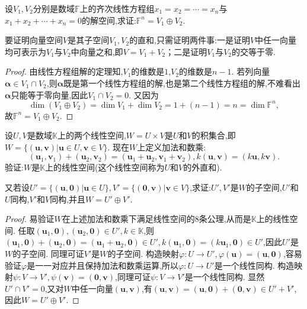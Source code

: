 \documentclass[../../main.tex]{subfiles}
\begin{document}
\begin{example}
设\(V_1,V_2\)分别是数域\(\mathbb{F}\)上的齐次线性方程组\(x_1 = x_2=\cdots = x_n\)与\(x_1 + x_2+\cdots + x_n = 0\)的解空间,求证:\(\mathbb{F}^n = V_1\oplus V_2\).
\end{example}
\begin{note}
要证明向量空间\(V\)是其子空间\(V_1,V_2\)的直和,只需证明两件事:一是证明\(V\)中任一向量均可表示为\(V_1\)与\(V_2\)中向量之和,即\(V = V_1 + V_2\)；二是证明\(V_1\)与\(V_2\)的交等于零.
\end{note}
\begin{proof}
由线性方程组解的定理知,\(V_1\)的维数是\(1\),\(V_2\)的维数是\(n - 1\). 若列向量\(\boldsymbol{\alpha}\in V_1\cap V_2\),则\(\boldsymbol{\alpha}\)既是第一个线性方程组的解,也是第二个线性方程组的解,不难看出\(\boldsymbol{\alpha}\)只能等于零向量,因此\(V_1\cap V_2 = 0\). 又因为
\[
\dim(V_1\oplus V_2)=\dim V_1+\dim V_2=1+(n - 1)=n=\dim\mathbb{F}^n,
\]
故\(\mathbb{F}^n = V_1\oplus V_2\).
\end{proof}

\begin{example}
设\(U,V\)是数域\(\mathbb{K}\)上的两个线性空间,\(W = U\times V\)是\(U\)和\(V\)的积集合,即\(W=\{(\boldsymbol{u},\boldsymbol{v})|\boldsymbol{u}\in U,\boldsymbol{v}\in V\}\). 现在\(W\)上定义加法和数乘:
\[
(\boldsymbol{u}_1,\boldsymbol{v}_1)+(\boldsymbol{u}_2,\boldsymbol{v}_2)=(\boldsymbol{u}_1+\boldsymbol{u}_2,\boldsymbol{v}_1+\boldsymbol{v}_2),k(\boldsymbol{u},\boldsymbol{v})=(k\boldsymbol{u},k\boldsymbol{v}).
\]
验证:\(W\)是\(\mathbb{K}\)上的线性空间(这个线性空间称为\(U\)和\(V\)的外直和).

又若设\(U'=\{(\boldsymbol{u},\boldsymbol{0})|\boldsymbol{u}\in U\},V'=\{(\boldsymbol{0},\boldsymbol{v})|\boldsymbol{v}\in V\}\),求证:\(U',V'\)是\(W\)的子空间,\(U'\)和\(U\)同构,\(V'\)和\(V\)同构,并且\(W = U'\oplus V'\).
\end{example}
\begin{proof}
易验证\(W\)在上述加法和数乘下满足线性空间的8条公理,从而是\(\mathbb{K}\)上的线性空间. 任取\((\boldsymbol{u}_1,\boldsymbol{0}),(\boldsymbol{u}_2,\boldsymbol{0})\in U',k\in\mathbb{K}\),则\((\boldsymbol{u}_1,\boldsymbol{0})+(\boldsymbol{u}_2,\boldsymbol{0})=(\boldsymbol{u}_1+\boldsymbol{u}_2,\boldsymbol{0})\in U',k(\boldsymbol{u}_1,\boldsymbol{0})=(k\boldsymbol{u}_1,\boldsymbol{0})\in U'\),因此\(U'\)是\(W\)的子空间. 同理可证\(V'\)是\(W\)的子空间. 构造映射\(\varphi:U\to U',\varphi(\boldsymbol{u})=(\boldsymbol{u},\boldsymbol{0})\),容易验证\(\varphi\)是一一对应并且保持加法和数乘运算,所以\(\varphi:U\to U'\)是一个线性同构. 构造映射\(\psi:V\to V',\psi(\boldsymbol{v})=(\boldsymbol{0},\boldsymbol{v})\),同理可证\(\psi:V\to V'\)是一个线性同构. 显然\(U'\cap V' = 0\),又对\(W\)中任一向量\((\boldsymbol{u},\boldsymbol{v})\),有\((\boldsymbol{u},\boldsymbol{v})=(\boldsymbol{u},\boldsymbol{0})+(\boldsymbol{0},\boldsymbol{v})\in U'+V'\),因此\(W = U'\oplus V'\). 
\end{proof}
\end{document}
